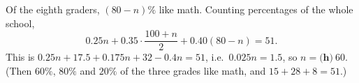 Of the eighth graders, $(80-n)\%$ like math. Counting percentages of the whole school,
\[
0.25n+0.35\cdot\dfrac{100+n}{2}+0.40(80-n)=51 .
\]
This is $0.25n+17.5+0.175n+32-0.4n=51$, i.e.\ $0.025n=1.5$, so $n=\boxed{\textbf{(h)}\ 60}$. (Then $60\%$, $80\%$ and $20\%$ of the three grades like math, and $15+28+8=51$.)
